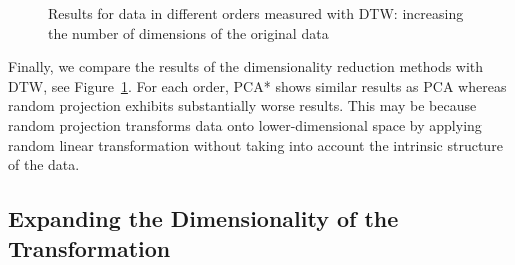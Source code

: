 \documentclass[pdftex,12pt,a4paper]{report}
\begin{document}
\begin{figure}[!htb]
    \caption{Results for data in different orders measured with DTW: increasing the number of dimensions of the original data}\label{fig:avg_dev_vs_high_dim-dtw}
\end{figure}
\FloatBarrier

Finally, we compare the results of the dimensionality reduction methods with DTW, see Figure~\ref{fig:avg_dev_vs_high_dim-dtw}.
For each order, PCA* shows similar results as PCA whereas random projection exhibits substantially worse results.
This may be because random projection transforms data onto lower-dimensional space by applying random linear transformation without taking into account the intrinsic structure of the data.

\subsection{Expanding the Dimensionality of the Transformation} \label{sec:avg_dev_vs_dyn_low_dims}
\end{document}
